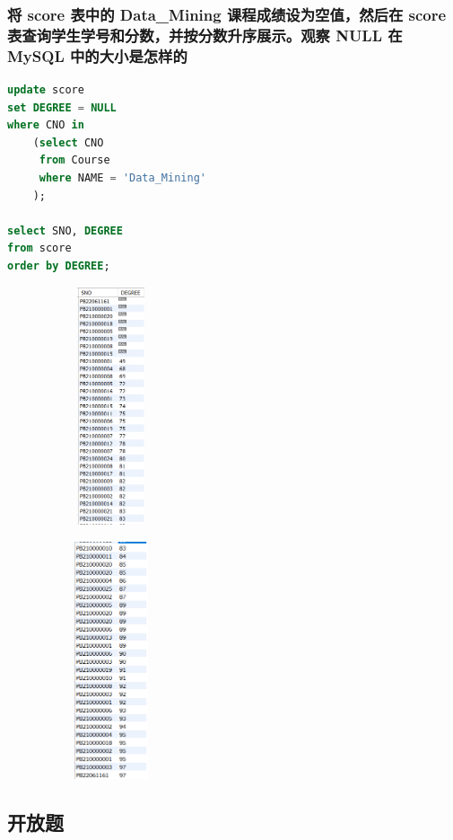 \documentclass{ctexart}
\begin{document}
\subsubsection{将 score 表中的 Data\_Mining 课程成绩设为空值，然后在 score 表查询学生学号和分数，并按分数升序展示。观察 NULL 在 MySQL 中的大小是怎样的}
\begin{lstlisting}[language=sql]
update score
set DEGREE = NULL
where CNO in
	(select CNO
     from Course
     where NAME = 'Data_Mining'
	);
    
select SNO, DEGREE 
from score
order by DEGREE;
\end{lstlisting}
\begin{figure}[H]
	\centering 
	\includegraphics[height=7cm,width=4cm]{58.png}
	\end{figure}
	\begin{figure}[H]
		\centering 
		\includegraphics[height=7cm,width=4cm]{59.png}
		\end{figure}
\subsection{开放题}
\end{document}
